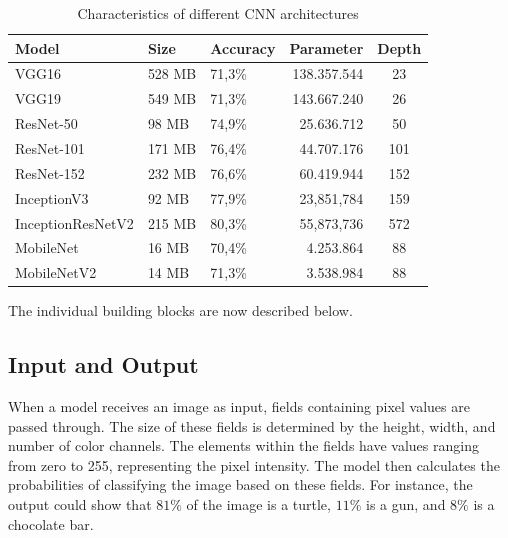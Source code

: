 {	
	\begin{table}
		\begin{tabular}{lllrc}
			Model             & Size   & Accuracy    & Parameter   & Depth \\ \hline
			VGG16             & 528 MB & 71{,}3\%    & 138.357.544 & 23 \\     
			VGG19             & 549 MB & 71{,}3\%    & 143.667.240 & 26 \\     
			ResNet-50         &  98 MB & 74{,}9\%    &  25.636.712 & 50 \\     
			ResNet-101        & 171 MB & 76{,}4\%    &  44.707.176 & 101 \\     
			ResNet-152        & 232 MB & 76{,}6\%    &  60.419.944 & 152 \\     
			InceptionV3       &  92 MB & 77{,}9\%    &  23,851,784 & 159 \\
			InceptionResNetV2 & 215 MB & 80{,}3\%    &  55,873,736 & 572 \\
			MobileNet         &  16 MB & 70,{4}\%    &   4.253.864 & 88 \\       
			MobileNetV2       &  14 MB & 71,{3}\%    &   3.538.984 & 88 \\       
		\end{tabular}
		\caption{Characteristics of different CNN architectures}\label{concept:Parameter}
	\end{table}
	
	The individual building blocks are now described below.
	
	
	
	\subsection*{Input and Output}
	When a model receives an image as input, fields containing pixel values are passed through. The size of these fields is determined by the height, width, and number of color channels. The elements within the fields have values ranging from zero to 255, representing the pixel intensity. The model then calculates the probabilities of classifying the image based on these fields. For instance, the output could show that $81\%$ of the image is a turtle, $11\%$ is a gun, and $8\%$ is a chocolate bar.
	
}
